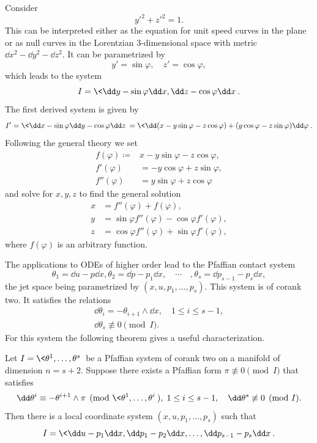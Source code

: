 \begin{example}
    Consider 
    \[y'^2+z'^2=1.\]
    This can be interpreted either as the equation for unit speed curves in the plane or as null curves in the Lorentzian $3$-dimensional space with metric $\dd x^2-\dd y^2-\dd z^2$. It can be parametrized by 
    \[y'=\sin\varphi ,\quad z'=\cos\varphi,\]
    which leads to the system 
    \[I=\<\dd y-\sin\varphi \dd x,\dd z-\cos\varphi \dd x\>.\]
    The first derived system is given by 
    \[I'=\<\dd x-\sin\varphi \dd y-\cos\varphi \dd z\>=\<\dd (x-y\sin\varphi-z\cos\varphi)+(y\cos\varphi-z\sin\varphi)\dd\varphi\>.\]
    Following the general theory we set 
    \begin{align}
        f(\varphi)\coloneqq & x-y\sin\varphi-z\cos\varphi,\\
        f'(\varphi)&=-y\cos\varphi+z\sin\varphi,\\
        f''(\varphi)&=y\sin\varphi+z\cos\varphi
    \end{align} 
    and solve for $x,y,z$ to find the general solution
    \begin{align}
        x&= f''(\varphi)+f(\varphi),\\
        y&= \sin\varphi f''(\varphi)-\cos\varphi f'(\varphi),\\
        z&=\cos\varphi f''(\varphi)+\sin\varphi f'(\varphi),
    \end{align}
    where $f(\varphi)$ is an arbitrary function.
\end{example}

The applications to ODEs of higher order lead to the Pfaffian contact system 
\[\theta_1=\dd u-p\dd x,\theta_2=\dd p-p_1\dd x,\quad\cdots\quad ,\theta_{s}=\dd p_{s-1}-p_s\dd x,\]
the jet space being parametrized by $(x,u,p_1,\ldots,p_s)$. This system is of corank two. It satisfies the relations 
\begin{align}
    \dd \theta_i=-\theta_{i+1}\wedge\dd x,\quad 1\leq i\leq s-1,\\
    \dd \theta_s\not\equiv 0 \pmod{I}.
\end{align}
For this system the following theorem gives a useful characterization.

\begin{thm}\label{thm goursat}
    Let $I=\<\theta^1,\ldots,\theta^s\>$ be a Pfaffian system of corank two on a manifold of dimension $n=s+2$. Suppose there exists a Pfaffian form $\pi\not\equiv 0\pmod{I}$ that satisfies 
    \[\dd\theta^i\equiv -\theta^{i+1}\wedge \pi \pmod{\<\theta^1,\ldots,\theta^i\>},\; 1\leq i\leq s-1,\quad \dd\theta^s\not\equiv 0\pmod{I}.\label{eq 34 Bryant}\]
    Then there is a local coordinate system $(x,u,p_1,\ldots,p_s)$ such that 
    \[I=\<\dd u-p_1 \dd x,\dd p_1-p_2\dd x,\ldots, \dd p_{s-1}-p_s\dd x\>.\]
\end{thm}


